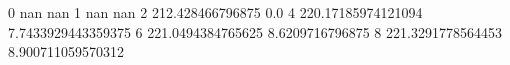 0 nan nan
1 nan nan
2 212.428466796875 0.0
4 220.17185974121094 7.7433929443359375
6 221.0494384765625 8.6209716796875
8 221.3291778564453 8.900711059570312

